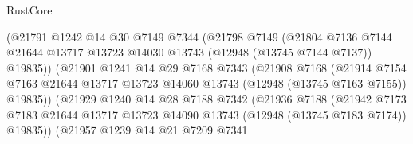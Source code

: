 \begin{lexlean}{RustCore}
\begin{coremodule}
                              (@21791
                                @1242
                                @14
                                @30
                                @7149
                                @7344
                                (@21798
                                  @7149
                                  (@21804
                                    @7136
                                    @7144
                                    @21644
                                    @13717
                                    @13723
                                    @14030
                                    @13743
                                    (@12948 (@13745 @7144 @7137))
                                    @19835))
                                (@21901
                                  @1241
                                  @14
                                  @29
                                  @7168
                                  @7343
                                  (@21908
                                    @7168
                                    (@21914
                                      @7154
                                      @7163
                                      @21644
                                      @13717
                                      @13723
                                      @14060
                                      @13743
                                      (@12948 (@13745 @7163 @7155))
                                      @19835))
                                  (@21929
                                    @1240
                                    @14
                                    @28
                                    @7188
                                    @7342
                                    (@21936
                                      @7188
                                      (@21942
                                        @7173
                                        @7183
                                        @21644
                                        @13717
                                        @13723
                                        @14090
                                        @13743
                                        (@12948 (@13745 @7183 @7174))
                                        @19835))
                                    (@21957
                                      @1239
                                      @14
                                      @21
                                      @7209
                                      @7341

\end{coremodule}
\end{lexlean}
